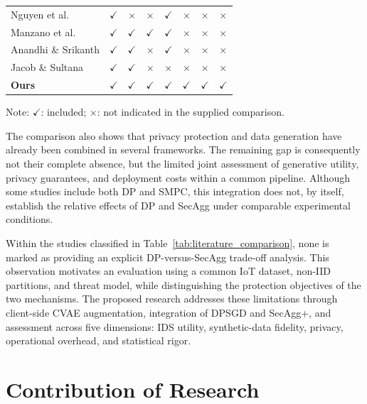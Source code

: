 \begin{table}[H]
{\begin{tabular}{lccccccc}
Nguyen et al.        & $\checkmark$ & $\times$     & $\times$     & $\checkmark$ & $\times$     & $\times$     & $\times$ \\
Manzano et al.       & $\checkmark$ & $\checkmark$ & $\checkmark$ & $\checkmark$ & $\times$     & $\times$     & $\times$ \\
Anandhi \& Srikanth  & $\checkmark$ & $\checkmark$ & $\times$     & $\checkmark$ & $\times$     & $\times$     & $\times$ \\
Jacob \& Sultana     & $\checkmark$ & $\checkmark$ & $\times$     & $\times$     & $\times$     & $\times$     & $\times$ \\
\midrule
\textbf{Ours}        & $\mathbf{\checkmark}$ & $\mathbf{\checkmark}$ & $\mathbf{\checkmark}$ & $\mathbf{\checkmark}$ & $\mathbf{\checkmark}$ & $\mathbf{\checkmark}$ & $\mathbf{\checkmark}$ \\
\bottomrule
\end{tabular}%
}
\begin{flushleft}
\footnotesize Note: $\checkmark$: included; $\times$: not indicated in the supplied comparison.
\end{flushleft}
\end{table}

The comparison also shows that privacy protection and data generation have already been combined in several frameworks. The remaining gap is consequently not their complete absence, but the limited joint assessment of generative utility, privacy guarantees, and deployment costs within a common pipeline. Although some studies include both DP and SMPC, this integration does not, by itself, establish the relative effects of DP and SecAgg under comparable experimental conditions.

Within the studies classified in Table~\ref{tab:literature_comparison}, none is marked as providing an explicit DP-versus-SecAgg trade-off analysis. This observation motivates an evaluation using a common IoT dataset, non-IID partitions, and threat model, while distinguishing the protection objectives of the two mechanisms. The proposed research addresses these limitations through client-side CVAE augmentation, integration of DPSGD and SecAgg+, and assessment across five dimensions: IDS utility, synthetic-data fidelity, privacy, operational overhead, and statistical rigor.

\section{Contribution of Research}\label{sec:contributions}

